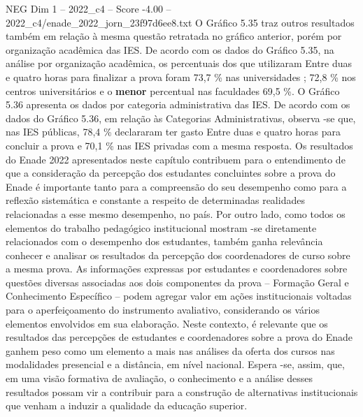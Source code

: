 \begin{textsample}{NEG Dim 1 – 2022\_c4 – Score -4.00 – 2022\_c4/enade\_2022\_jorn\_23f97d6ee8.txt}
O Gráfico 5.35 traz outros resultados também em relação à mesma questão retratada no gráfico anterior, porém por organização acadêmica das IES.
De acordo com os dados do Gráfico 5.35, na análise por organização acadêmica, os percentuais dos que utilizaram Entre duas e quatro horas para finalizar a prova foram 73,7 \% nas universidades ; 72,8 \% nos centros universitários e o \textbf{menor} percentual nas faculdades 69,5 \%.
O Gráfico 5.36 apresenta os dados por categoria administrativa das IES.
De acordo com os dados do Gráfico 5.36, em relação às Categorias Administrativas, observa -se que, nas IES públicas, 78,4 \% declararam ter gasto Entre duas e quatro horas para concluir a prova e 70,1 \% nas IES privadas com a mesma resposta.
Os resultados do Enade 2022 apresentados neste capítulo contribuem para o entendimento de que a consideração da percepção dos estudantes concluintes sobre a prova do Enade é importante tanto para a compreensão do seu desempenho como para a reflexão sistemática e constante a respeito de determinadas realidades relacionadas a esse mesmo desempenho, no país.
Por outro lado, como todos os elementos do trabalho pedagógico institucional mostram -se diretamente relacionados com o desempenho dos estudantes, também ganha relevância conhecer e analisar os resultados da percepção dos coordenadores de curso sobre a mesma prova.
As informações expressas por estudantes e coordenadores sobre questões diversas associadas aos dois componentes da prova – Formação Geral e Conhecimento Específico – podem agregar valor em ações institucionais voltadas para o aperfeiçoamento do instrumento avaliativo, considerando os vários elementos envolvidos em sua elaboração.
Neste contexto, é relevante que os resultados das percepções de estudantes e coordenadores sobre a prova do Enade ganhem peso como um elemento a mais nas análises da oferta dos cursos nas modalidades presencial e a distância, em nível nacional.
Espera -se, assim, que, em uma visão formativa de avaliação, o conhecimento e a análise desses resultados possam vir a contribuir para a construção de alternativas institucionais que venham a induzir a qualidade da educação superior.

\end{textsample}
